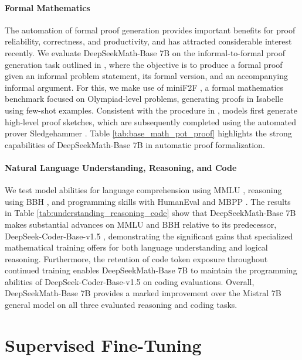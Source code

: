 \paragraph{Formal Mathematics}

The automation of formal proof generation provides important benefits for proof reliability, correctness, and productivity, and has attracted considerable interest recently. We evaluate DeepSeekMath-Base 7B on the informal-to-formal proof generation task outlined in \citep{dsp_proof}, where the objective is to produce a formal proof given an informal problem statement, its formal version, and an accompanying informal argument. For this, we make use of miniF2F \citep{minif2f}, a formal mathematics benchmark focused on Olympiad-level problems, generating proofs in Isabelle using few-shot examples. Consistent with the procedure in \cite{dsp_proof}, models first generate high-level proof sketches, which are subsequently completed using the automated prover Sledgehammer \citep{sledgehammer}. Table \ref{tab:base_math_pot_proof} highlights the strong capabilities of DeepSeekMath-Base 7B in automatic proof formalization.

\paragraph{Natural Language Understanding, Reasoning, and Code}

We test model abilities for language comprehension using MMLU \citep{mmlu}, reasoning using BBH \citep{bbh}, and programming skills with HumanEval \citep{codex} and MBPP \citep{mbpp}. The results in Table \ref{tab:understanding_reasoning_code} show that DeepSeekMath-Base 7B makes substantial advances on MMLU and BBH relative to its predecessor, DeepSeek-Coder-Base-v1.5 \citep{deepseek-coder}, demonstrating the significant gains that specialized mathematical training offers for both language understanding and logical reasoning. Furthermore, the retention of code token exposure throughout continued training enables DeepSeekMath-Base 7B to maintain the programming abilities of DeepSeek-Coder-Base-v1.5 on coding evaluations. Overall, DeepSeekMath-Base 7B provides a marked improvement over the Mistral 7B \citep{mistral} general model on all three evaluated reasoning and coding tasks.

\section{Supervised Fine-Tuning}

